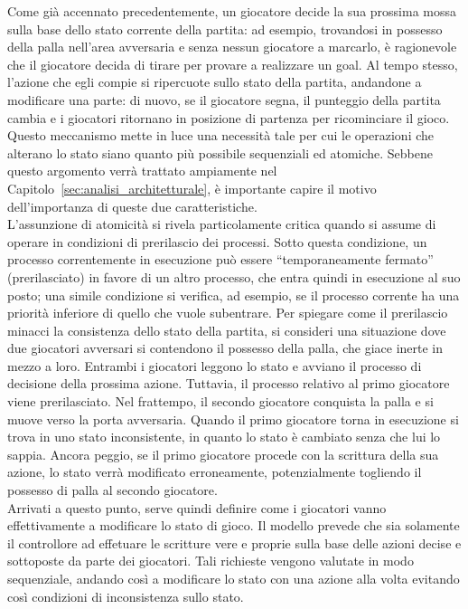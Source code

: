 Come già accennato precedentemente, un giocatore decide la sua prossima mossa sulla base dello stato corrente della partita: ad esempio, trovandosi in possesso della palla nell'area avversaria e senza nessun giocatore a marcarlo, è ragionevole che il giocatore decida di tirare per provare a realizzare un goal. Al tempo stesso, l'azione che egli compie si ripercuote sullo stato della partita, andandone a modificare una parte: di nuovo, se il giocatore segna, il punteggio della partita cambia e i giocatori ritornano in posizione di partenza per ricominciare il gioco. Questo meccanismo mette in luce una necessità tale per cui le operazioni che alterano lo stato siano quanto più possibile sequenziali ed atomiche. Sebbene questo argomento verrà trattato ampiamente nel Capitolo~\ref{sec:analisi_architetturale}, è importante capire il motivo dell'importanza di queste due caratteristiche.\\

L'assunzione di atomicità si rivela particolamente critica quando si assume di operare in condizioni di prerilascio dei processi. Sotto questa condizione, un processo correntemente in esecuzione può essere ``temporaneamente fermato'' (prerilasciato) in favore di un altro processo, che entra quindi in esecuzione al suo posto; una simile condizione si verifica, ad esempio, se il processo corrente ha una priorità inferiore di quello che vuole subentrare. Per spiegare come il prerilascio minacci la consistenza dello stato della partita, si consideri una situazione dove due giocatori avversari si contendono il possesso della palla, che giace inerte in mezzo a loro. Entrambi i giocatori leggono lo stato e avviano il processo di decisione della prossima azione. Tuttavia, il processo relativo al primo giocatore viene prerilasciato. Nel frattempo, il secondo giocatore conquista la palla e si muove verso la porta avversaria. Quando il primo giocatore torna in esecuzione si trova in uno stato inconsistente, in quanto lo stato è cambiato senza che lui lo sappia. Ancora peggio, se il primo giocatore procede con la scrittura della sua azione, lo stato verrà modificato erroneamente, potenzialmente togliendo il possesso di palla al secondo giocatore.\\

Arrivati a questo punto, serve quindi definire come i giocatori vanno effettivamente a modificare lo stato di gioco. Il modello prevede che sia solamente il controllore ad effetuare le scritture vere e proprie sulla base delle azioni decise e sottoposte da parte dei giocatori. Tali richieste vengono valutate in modo sequenziale, andando così a modificare lo stato con una azione alla volta evitando così condizioni di inconsistenza sullo stato.\\

